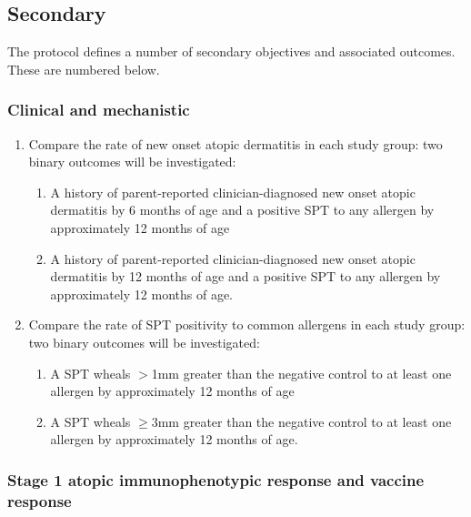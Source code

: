 \documentclass{bmcart}
\begin{document}
\subsection*{Secondary}

The protocol defines a number of secondary objectives and associated outcomes.
These are numbered below.

\subsubsection*{Clinical and mechanistic}

\begin{enumerate}
	\item Compare the rate of new onset atopic dermatitis in each study group:
	two binary outcomes will be investigated:
	\begin{enumerate}
		\item A history of parent-reported clinician-diagnosed new onset atopic dermatitis by 6 months of age and a positive SPT to any allergen by approximately 12 months of age
		\item A history of parent-reported clinician-diagnosed new onset atopic dermatitis by 12 months of age and a positive SPT to any allergen by approximately 12 months of age.
	\end{enumerate}
	\item Compare the rate of SPT positivity to common allergens in each study group:
	two binary outcomes will be investigated:
	\begin{enumerate}
		\item A SPT wheals $>$1mm greater than the negative control to at least one allergen by approximately 12 months of age
		\item A SPT wheals $\geq$3mm greater than the negative control to at least one allergen by approximately 12 months of age.
	\end{enumerate}
\end{enumerate}

\subsubsection*{Stage 1 atopic immunophenotypic response and vaccine response}
\end{document}
